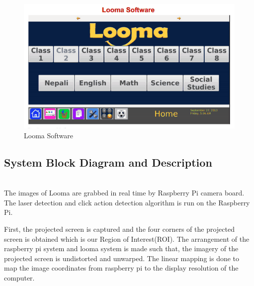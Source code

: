 \documentclass[12pt, a4paper]{article}
\begin{document}
{\begin{figure}[htp]
	\centering
		\includegraphics[scale=0.3]{loomasoftware.png}
	\caption{Looma Software}
\label{}
\end{figure}

\subsection{System Block Diagram and Description}
~\\
The images of Looma are grabbed in real time by Raspberry Pi camera board. The laser detection and click action detection algorithm is run on the Raspberry Pi.

First, the projected screen is captured and the four corners of the projected screen is obtained which is our Region of Interest(ROI). The arrangement of the raspberry pi system and looma system is made such that, the imagery of the projected screen is undistorted and unwarped. The linear mapping is done to map the image coordinates from raspberry pi to the display resolution of the computer.
\newpage

}
\end{document}
